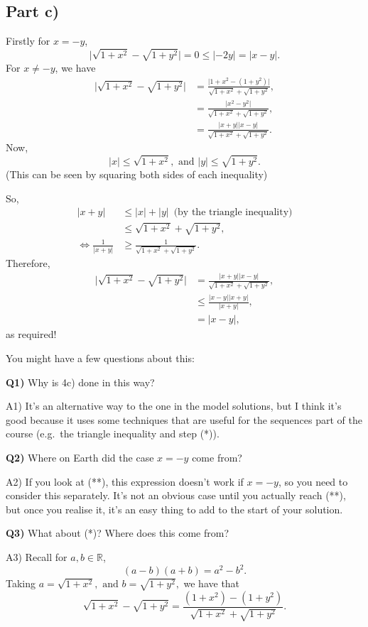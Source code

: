 \documentclass[
  12pt,
  a4paper]{extarticle}
\theoremstyle{plain}
\theoremstyle{definition}
\theoremstyle{plain}
\theoremstyle{plain}
\theoremstyle{plain}
\theoremstyle{plain}
\theoremstyle{definition}
\theoremstyle{definition}
\theoremstyle{remark}
\theoremstyle{remark}
\let\BeginKnitrBlock\begin \let\EndKnitrBlock\end
\renewcommand{\;}{\,}
\begin{document}
\hypertarget{part-c}{%
\subsection*{Part c)}\label{part-c}}

\BeginKnitrBlock{solution*}
Firstly for \(x = -y\), \[\lvert \sqrt{1 + x^2} - \sqrt{1 + y^2}\rvert = 0 \leq \lvert -2y \rvert = \lvert x - y \rvert.\] For \(x \neq -y\), we have
\begin{align}
\lvert \sqrt{1 + x^2} - \sqrt{1 + y^2}\rvert &= \frac{\lvert 1 + x^2 - (1 + y^2) \rvert}{\sqrt{1 + x^2} + \sqrt{1 + y^2}},\tag{*}\\
&= \frac{\lvert x^2 - y^2 \rvert}{\sqrt{1 + x^2} + \sqrt{1 + y^2}},\nonumber\\
&= \frac{\lvert x + y \rvert \lvert x - y \rvert}{\sqrt{1 + x^2} + \sqrt{1 + y^2}}.\nonumber
\end{align}
Now, \[\lvert x \rvert \leq \sqrt{1 + x^2}, \;\;\text{and}\;\; \lvert y \rvert \leq \sqrt{1 + y^2}.\] (This can be seen by squaring both sides of each inequality)

So,
\begin{align*}
\lvert x + y \rvert &\leq \lvert x \rvert + \lvert y \rvert \;\;\; \text{(by the triangle inequality)}\\
&\leq \sqrt{1 + x^2} + \sqrt{1 + y^2},\\
\Leftrightarrow \frac{1}{\lvert x + y \rvert} &\geq \frac{1}{\sqrt{1 + x^2} + \sqrt{1 + y^2}}.
\end{align*}
Therefore,
\begin{align}
\lvert \sqrt{1 + x^2} - \sqrt{1 + y^2}\rvert &= \frac{\lvert x + y \rvert \lvert x - y \rvert}{\sqrt{1 + x^2} + \sqrt{1 + y^2}},\nonumber\\
&\leq \frac{\lvert x - y \rvert\lvert x + y \rvert}{\lvert x + y \rvert},\tag{**}\\
&= \lvert x - y \rvert,\nonumber
\end{align}
as required!
\EndKnitrBlock{solution*}

You might have a few questions about this:

\textbf{Q1)} Why is 4c) done in this way?

A1) It's an alternative way to the one in the model solutions, but I think it's good because it uses some techniques that are useful for the sequences part of the course (e.g.~the triangle inequality and step (*)).

\textbf{Q2)} Where on Earth did the case \(x = -y\) come from?

A2) If you look at (**), this expression doesn't work if \(x = -y\), so you need to consider this separately. It's not an obvious case until you actually reach (**), but once you realise it, it's an easy thing to add to the start of your solution.

\textbf{Q3)} What about (*)? Where does this come from?

A3) Recall for \(a,b \in \mathbb{R}\), \[(a-b)(a+b) = a^2 - b^2.\] Taking \(a = \sqrt{1 + x^2}, \;\; \text{and} \;\; b = \sqrt{1 + y^2},\) we have that \[\sqrt{1 + x^2} - \sqrt{1 + y^2} = \frac{(1+x^2)-(1+y^2)}{\sqrt{1 + x^2} + \sqrt{1 + y^2}}.\]
\end{document}
